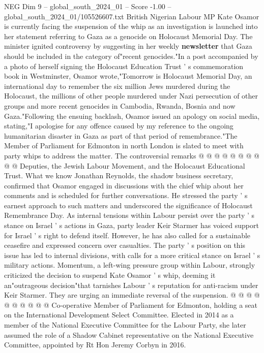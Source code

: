 \begin{textsample}{NEG Dim 9 – global\_south\_2024\_01 – Score -1.00 – global\_south\_2024\_01/105526607.txt}  \label{ex:f9_neg_391}
British Nigerian Labour MP Kate Osamor is currently facing the suspension of the whip as an investigation is launched into her statement referring to Gaza as a genocide on Holocaust Memorial Day.
The minister ignited controversy by suggesting in her weekly \textbf{newsletter} that Gaza should be included in the category of"recent genocides."In a post accompanied by a photo of herself signing the Holocaust Education Trust ' s commemoration book in Westminster, Osamor wrote,"Tomorrow is Holocaust Memorial Day, an international day to remember the six million Jews murdered during the Holocaust, the millions of other people murdered under Nazi persecution of other groups and more recent genocides in Cambodia, Rwanda, Bosnia and now Gaza."Following the ensuing backlash, Osamor issued an apology on social media, stating,"I apologise for any offence caused by my reference to the ongoing humanitarian disaster in Gaza as part of that period of remembrance."The Member of Parliament for Edmonton in north London is slated to meet with party whips to address the matter.
The controversial remarks @ @ @ @ @ @ @ @ @ @ Deputies, the Jewish Labour Movement, and the Holocaust Educational Trust.
What we know Jonathan Reynolds, the shadow business secretary, confirmed that Osamor engaged in discussions with the chief whip about her comments and is scheduled for further conversations.
He stressed the party ' s earnest approach to such matters and underscored the significance of Holocaust Remembrance Day.
As internal tensions within Labour persist over the party ' s stance on Israel ' s actions in Gaza, party leader Keir Starmer has voiced support for Israel ' s right to defend itself.
However, he has also called for a sustainable ceasefire and expressed concern over casualties.
The party ' s position on this issue has led to internal divisions, with calls for a more critical stance on Israel ' s military actions.
Momentum, a left-wing pressure group within Labour, strongly criticized the decision to suspend Kate Osamor ' s whip, deeming it an"outrageous decision"that tarnishes Labour ' s reputation for anti-racism under Keir Starmer.
They are urging an immediate reversal of the suspension. @ @ @ @ @ @ @ @ @ @ Co-operative Member of Parliament for Edmonton, holding a seat on the International Development Select Committee.
Elected in 2014 as a member of the National Executive Committee for the Labour Party, she later assumed the role of a Shadow Cabinet representative on the National Executive Committee, appointed by Rt Hon Jeremy Corbyn in 2016.

\end{textsample}
